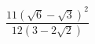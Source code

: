 \begin{ex}[type=calculate]
	\begin{condition}
		\( \dfrac{11(\sqrt{6}-\sqrt{3})^2}{12(3-2\sqrt{2})} \)
	\end{condition}
\end{ex}